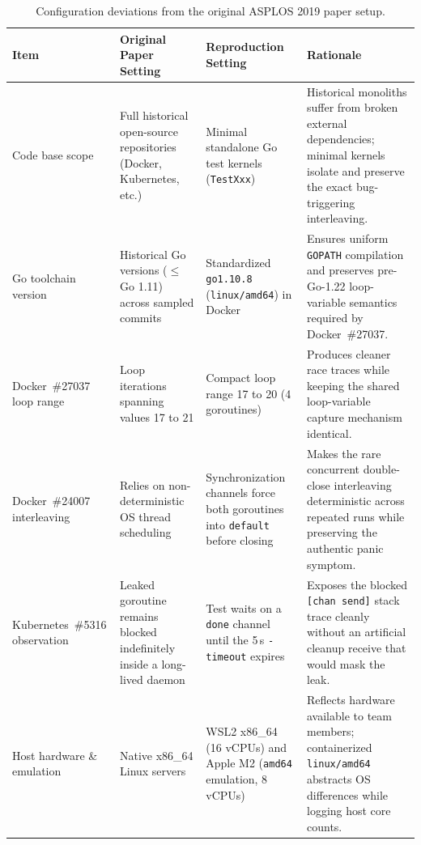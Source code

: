 \begin{table}[H]
  \centering
  \caption{Configuration deviations from the original ASPLOS 2019 paper setup.}
  \label{tab:deviations}
  \footnotesize
  \setlength{\tabcolsep}{4pt}
  \renewcommand{\arraystretch}{1.15}
  \begin{tabularx}{\linewidth}{L{2.7cm}YYY}
    \toprule
    Item & Original Paper Setting & Reproduction Setting & Rationale \\
    \midrule
    Code base scope & Full historical open-source repositories (Docker, Kubernetes, etc.) & Minimal standalone Go test kernels (\texttt{TestXxx}) & Historical monoliths suffer from broken external dependencies; minimal kernels isolate and preserve the exact bug-triggering interleaving. \\
    Go toolchain version & Historical Go versions ($\le$ Go 1.11) across sampled commits & Standardized \texttt{go1.10.8} (\texttt{linux/amd64}) in Docker & Ensures uniform \texttt{GOPATH} compilation and preserves pre-Go-1.22 loop-variable semantics required by Docker~\#27037. \\
    Docker~\#27037 loop range & Loop iterations spanning values 17 to 21 & Compact loop range 17 to 20 (4 goroutines) & Produces cleaner race traces while keeping the shared loop-variable capture mechanism identical. \\
    Docker~\#24007 interleaving & Relies on non-deterministic OS thread scheduling & Synchronization channels force both goroutines into \texttt{default} before closing & Makes the rare concurrent double-close interleaving deterministic across repeated runs while preserving the authentic panic symptom. \\
    Kubernetes~\#5316 observation & Leaked goroutine remains blocked indefinitely inside a long-lived daemon & Test waits on a \texttt{done} channel until the 5\,s \texttt{-timeout} expires & Exposes the blocked \texttt{[chan send]} stack trace cleanly without an artificial cleanup receive that would mask the leak. \\
    Host hardware \& emulation & Native x86\_64 Linux servers & WSL2 x86\_64 (16 vCPUs) and Apple M2 (\texttt{amd64} emulation, 8 vCPUs) & Reflects hardware available to team members; containerized \texttt{linux/amd64} abstracts OS differences while logging host core counts. \\
    \bottomrule
  \end{tabularx}
\end{table}
